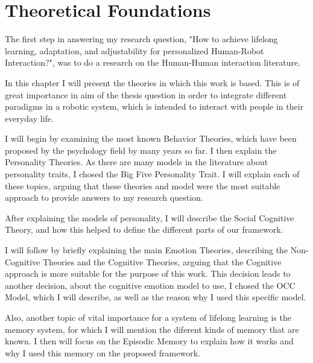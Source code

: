 
\chapter{Theoretical Foundations} %

\label{Chapter2} %

The first step in answering my research question, "How to achieve lifelong learning, adaptation, and adjustability for personalized Human-Robot Interaction?", was to do a research on the Human-Human interaction literature.

In this chapter I will present the theories in which this work is based. This is of great importance in aim of the thesis question in order to integrate different paradigms in a robotic system, which is intended to interact with people in their everyday life.

I will begin by examining the most known Behavior Theories, which have been proposed by the psychology field by many years so far. I then explain the Personality Theories. As there are many models in the literature about personality traits, I chosed the Big Five Personality Trait. I will explain each of these topics, arguing that these theories and model were the most suitable approach to provide answers to my research question. 

After explaining the models of personality, I will describe the Social Cognitive Theory, and how this helped to define the different parts of our framework.

I will follow by briefly explaining the main Emotion Theories, describing the Non-Cognitive Theories and the Cognitive Theories, arguing that the Cognitive approach is more suitable for the purpose of this work. This decision leads to another decision, about the cognitive emotion model to use, I chosed the OCC Model, which I will describe, as well as the reason why I used this specific model.

Also, another topic of vital importance for a system of lifelong learning is the memory system, for which I will mention the diferent kinds of memory that are known. I then will focus on the Episodic Memory to explain how it works and why I used this memory on the proposed framework. 


